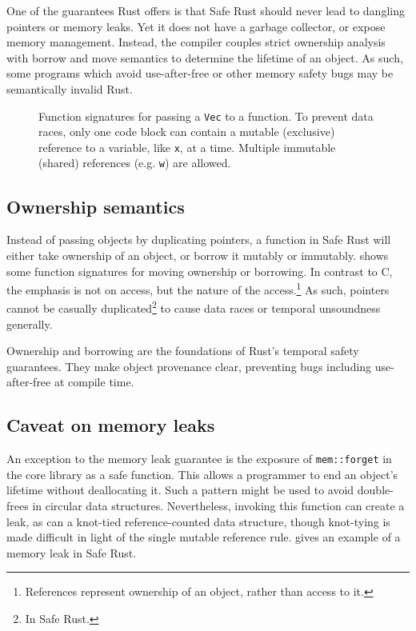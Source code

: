 \documentclass[dissertation.tex]{subfiles}
\begin{document}
One of the guarantees Rust offers is that Safe Rust should never lead to
dangling pointers or memory leaks.
Yet it does not have a garbage collector, or expose memory management.
Instead, the compiler couples strict ownership analysis with borrow and
move semantics to determine the lifetime of an object.
As such, some programs which avoid use-after-free or other memory safety
bugs may be semantically invalid Rust.

\begin{figure}[ht]
    
    \caption{
        Function signatures for passing a \texttt{Vec} to a function.
        To prevent data races, only one code block can contain a mutable
        (exclusive) reference to a variable, like \texttt{x}, at a time.
        Multiple immutable (shared) references (e.g. \texttt{w}) are
        allowed.
    }
    \label{lst:rust-ownership}
\end{figure}

\subsection{Ownership semantics}

Instead of passing objects by duplicating pointers, a function in Safe
Rust will either take ownership of an object, or borrow it mutably or
immutably.
 shows some function signatures for
moving ownership or borrowing.
In contrast to C, the emphasis is not on access, but the nature of the
access.\footnote{References represent ownership of an object, rather
than access to it.}
As such, pointers cannot be casually duplicated\footnote{In Safe Rust.}
to cause data races or temporal unsoundness generally.

Ownership and borrowing are the foundations of Rust's temporal safety
guarantees.
They make object provenance clear, preventing bugs including
use-after-free at compile time.

\subsection{Caveat on memory leaks}
An exception to the memory leak guarantee is the exposure of
\texttt{mem::forget} in the core library as a safe function.
This allows a programmer to end an object's lifetime without
deallocating it.
Such a pattern might be used to avoid double-frees in circular data
structures.
Nevertheless, invoking this function can create a leak, as can a
knot-tied reference-counted data structure, though knot-tying is made
difficult in light of the single mutable reference rule.
 gives an example of a memory leak in
Safe Rust.
\end{document}
